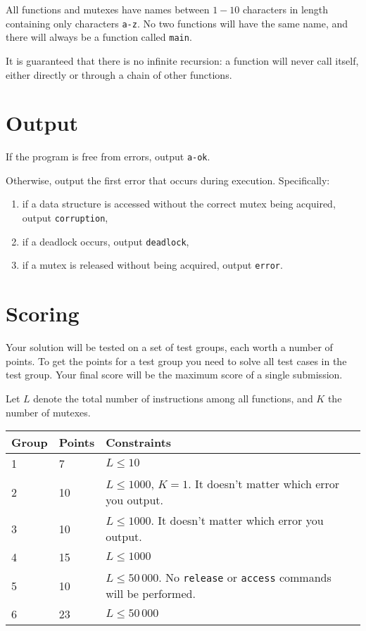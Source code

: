 All functions and mutexes have names between $1-10$ characters in length containing only characters \texttt{a-z}.
No two functions will have the same name, and there will always be a function called \texttt{main}.

It is guaranteed that there is no infinite recursion: a function will never call itself, either directly or through a chain of other functions.

\section*{Output}
If the program is free from errors, output \texttt{a-ok}.

Otherwise, output the first error that occurs during execution. Specifically:
\begin{enumerate}
  \item if a data structure is accessed without the correct mutex being acquired, output \texttt{corruption},
  \item if a deadlock occurs, output \texttt{deadlock},
  \item if a mutex is released without being acquired, output \texttt{error}.
\end{enumerate}

\section*{Scoring}
Your solution will be tested on a set of test groups, each worth a number of points.
To get the points for a test group you need to solve all test cases in the test group.
Your final score will be the maximum score of a single submission.

Let $L$ denote the total number of instructions among all functions, and $K$ the number of mutexes.

\noindent
\begin{tabular}{| l | l | l | l |}
\hline
Group & Points & Constraints \\ \hline
1     & 7      & $L \le 10$ \\ \hline
2     & 10     & $L \le 1000$, $K = 1$. It doesn't matter which error you output. \\ \hline
3     & 10      & $L \le 1000$. It doesn't matter which error you output. \\ \hline
4     & 15     & $L \le 1000$ \\ \hline
5     & 10     & $L \le 50\,000$. No \texttt{release} or \texttt{access} commands will be performed. \\ \hline
6     & 23     & $L \le 50\,000$ \\ \hline
\end{tabular}
